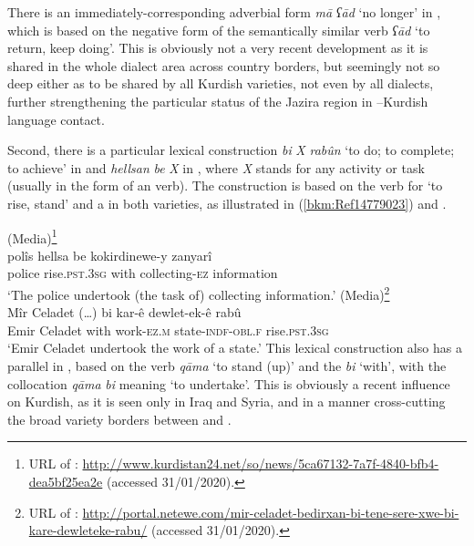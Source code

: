 \documentclass[output=paper]{langsci/langscibook}
\begin{document}
There is an immediately-corresponding adverbial form \textit{mā} \textit{ʕād} ‘no longer’ in , which is based on the negative form of the semantically similar verb \textit{ʕād} ‘to return, keep doing’. This is obviously not a very recent development as it is shared in the whole dialect area across country borders, but seemingly not so deep either as to be shared by all Kurdish varieties, not even by all  dialects, further strengthening the particular status of the Jazira region in --Kurdish language contact. 

Second, there is a particular lexical construction \textit{bi} \textit{X} \textit{rabûn} ‘to do; to complete; to achieve’ in  and \textit{hellsan} \textit{be} \textit{X} in , where \textit{X} stands for any activity or task (usually in the form of an  verb). The construction is based on the verb for ‘to rise, stand’ and a  in both varieties, as illustrated in (\ref{bkm:Ref14779023}) and .

\ea {} (Media)\label{bkm:Ref14779023}\footnote{URL of : \url{http://www.kurdistan24.net/so/news/5ca67132-7a7f-4840-bfb4-dea5bf25ea2e} (accessed 31/01/2020).}\\
\gll polîs hellsa be kokirdinewe-y zanyarî\\
     police rise.\textsc{pst.3sg} with collecting-\textsc{ez} information\\
\glt ‘The police undertook (the task of) collecting information.’
\ex \label{17}  (Media)\footnote{URL of : \url{http://portal.netewe.com/mir-celadet-bedirxan-bi-tene-sere-xwe-bi-kare-dewleteke-rabu/} (accessed 31/01/2020).}\\
\gll Mîr {Celadet (…)} bi kar-ê dewlet-ek-ê rabû\\
     Emir Celadet with work-\textsc{ez.m} state-\textsc{indf-obl.f} rise.\textsc{pst.3sg}       \\
\glt ‘Emir Celadet undertook the work of a state.’\z
This lexical construction also has a parallel in  , based on the verb \textit{qāma} ‘to stand (up)’ and the  \textit{bi} ‘with’, with the collocation \textit{qāma} \textit{bi} meaning ‘to undertake’. This is obviously a recent influence on Kurdish, as it is seen only in Iraq and Syria, and in a manner cross-cutting the broad variety borders between  and . 
\end{document}
